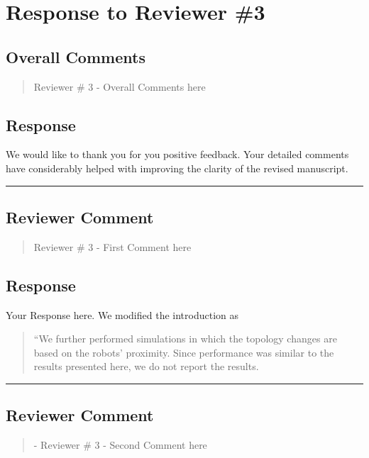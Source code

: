 \section{Response to Reviewer \#3}
\subsection*{Overall Comments}
\begin{mdframed}
\begin{quote}
	 Reviewer \# 3 - Overall Comments here
\end{quote}
\end{mdframed}

\subsection{Response} 
We would like to thank you for you positive feedback. Your detailed comments have considerably helped with improving the clarity of the revised manuscript.

\noindent\rule{17cm}{2.0pt}

\subsection{Reviewer Comment}
\begin{mdframed}
\begin{quote}
	Reviewer \# 3 - First Comment here
\end{quote}
\end{mdframed}

\subsection{Response} 
Your Response here. We modified the introduction as

\begin{quote}
	``We further performed simulations in which the topology changes are based on the robots' proximity. Since performance was similar to the results presented here, we do not report the results.
\end{quote}

\noindent\rule{17cm}{2.0pt}

\subsection{Reviewer Comment}
\begin{mdframed}
\begin{quote}
	- Reviewer \# 3 - Second Comment here
\end{quote}
\end{mdframed}


